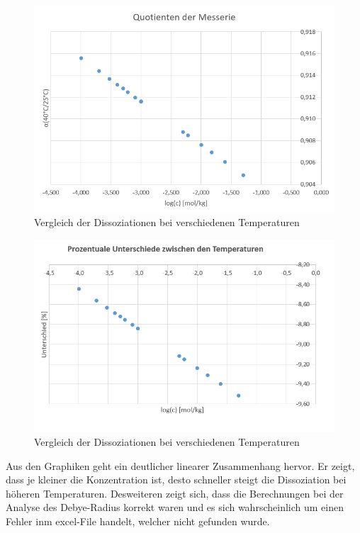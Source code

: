 \begin{figure}[H]
    \centering
    \includegraphics[scale=.7]{../src/img/alpha_quotient.png}
    \caption{Vergleich der Dissoziationen bei verschiedenen Temperaturen}
\end{figure}

\begin{figure}[H]
    \centering
    \includegraphics[scale=.7]{../src/img/alpha_prozent.png}
    \caption{Vergleich der Dissoziationen bei verschiedenen Temperaturen}
\end{figure}

Aus den Graphiken geht ein deutlicher linearer Zusammenhang hervor. Er zeigt, dass je kleiner die Konzentration ist, desto schneller steigt
die Dissoziation bei höheren Temperaturen. Desweiteren zeigt sich, dass die Berechnungen bei der Analyse des Debye-Radius korrekt waren und
es sich wahrscheinlich um einen Fehler inm excel-File handelt, welcher nicht gefunden wurde.   

